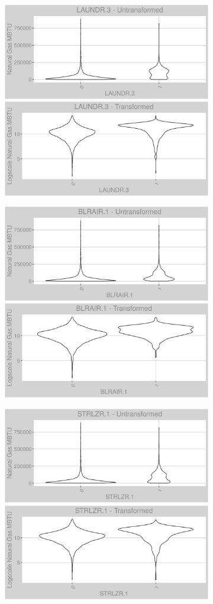 \FloatBarrier
\newpage
\begin{figure}
\centering
\begin{subfigure}{1\textwidth}
\centering
\includegraphics[width=.49\textwidth, height=0.3\textheight]{Images/natural_gas_psf_var_original_18.png}
\includegraphics[width=.49\textwidth, height=0.3\textheight]{Images/natural_gas_psf_var_transformed_18.png}
\end{subfigure}
\begin{subfigure}{1\textwidth}
\centering
\includegraphics[width=.49\textwidth, height=0.3\textheight]{Images/natural_gas_psf_var_original_19.png}
\includegraphics[width=.49\textwidth, height=0.3\textheight]{Images/natural_gas_psf_var_transformed_19.png}
\end{subfigure}
\begin{subfigure}{1\textwidth}
\centering
\includegraphics[width=.49\textwidth, height=0.3\textheight]{Images/natural_gas_psf_var_original_20.png}
\includegraphics[width=.49\textwidth, height=0.3\textheight]{Images/natural_gas_psf_var_transformed_20.png}
\end{subfigure}
\end{figure}